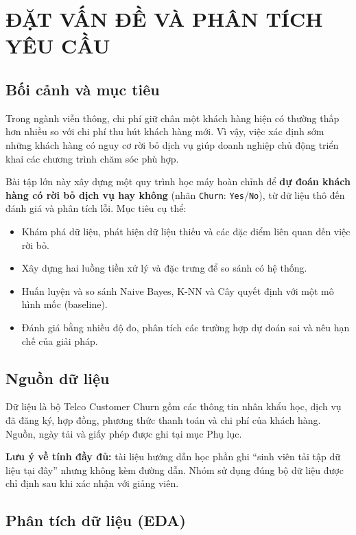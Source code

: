 \chapter{ĐẶT VẤN ĐỀ VÀ PHÂN TÍCH YÊU CẦU}

\section{Bối cảnh và mục tiêu}
Trong ngành viễn thông, chi phí giữ chân một khách hàng hiện có thường thấp hơn nhiều so với chi phí thu hút khách hàng mới.
Vì vậy, việc xác định sớm những khách hàng có nguy cơ rời bỏ dịch vụ giúp doanh nghiệp chủ động triển khai các chương trình chăm sóc phù hợp.

Bài tập lớn này xây dựng một quy trình học máy hoàn chỉnh để \textbf{dự đoán khách hàng có rời bỏ dịch vụ hay không}
(nhãn \texttt{Churn}: \texttt{Yes}/\texttt{No}), từ dữ liệu thô đến đánh giá và phân tích lỗi.
Mục tiêu cụ thể:
\begin{itemize}
    \item Khám phá dữ liệu, phát hiện dữ liệu thiếu và các đặc điểm liên quan đến việc rời bỏ.
    \item Xây dựng hai luồng tiền xử lý và đặc trưng để so sánh có hệ thống.
    \item Huấn luyện và so sánh Naive Bayes, K-NN và Cây quyết định với một mô hình mốc (baseline).
    \item Đánh giá bằng nhiều độ đo, phân tích các trường hợp dự đoán sai và nêu hạn chế của giải pháp.
\end{itemize}

\section{Nguồn dữ liệu}
Dữ liệu là bộ Telco Customer Churn gồm các thông tin nhân khẩu học, dịch vụ đã đăng ký, hợp đồng, phương thức thanh toán
và chi phí của khách hàng. Nguồn, ngày tải và giấy phép được ghi tại mục Phụ lục.

\textbf{Lưu ý về tính đầy đủ:} tài liệu hướng dẫn học phần ghi ``sinh viên tải tập dữ liệu tại đây'' nhưng không kèm đường dẫn.
Nhóm sử dụng đúng bộ dữ liệu được chỉ định sau khi xác nhận với giảng viên.

\section{Phân tích dữ liệu (EDA)}
